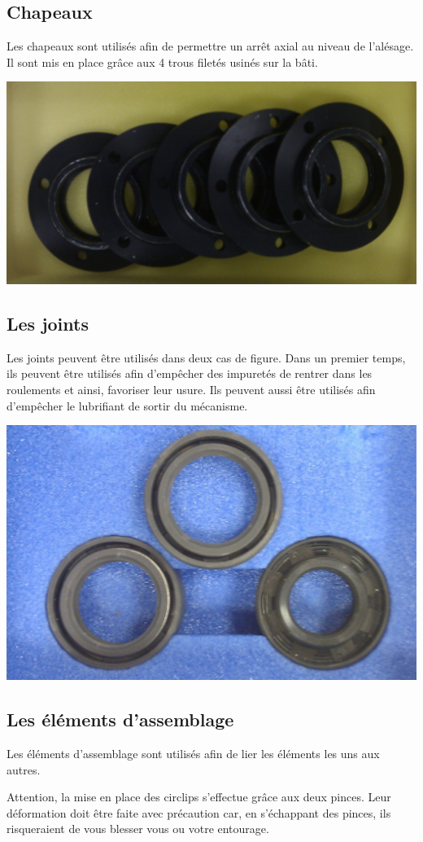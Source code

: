 \subsection{Chapeaux}

Les chapeaux sont utilisés afin de permettre un arrêt axial au niveau de l'alésage. Il sont mis en place grâce aux 4 trous filetés usinés sur la bâti.

\begin{center}
\includegraphics[width=0.5\linewidth]{img/Roulement6.jpg}
\end{center}

\newpage

\subsection{Les joints}

Les joints peuvent être utilisés dans deux cas de figure. Dans un premier temps, ils peuvent être utilisés afin d'empêcher des impuretés de rentrer dans les roulements et ainsi, favoriser leur usure. Ils peuvent aussi être utilisés afin d'empêcher le lubrifiant de sortir du mécanisme.

\begin{center}
\includegraphics[width=0.5\linewidth]{img/Roulement7.jpg}
\end{center}

\subsection{Les éléments d'assemblage}

Les éléments d'assemblage sont utilisés afin de lier les éléments les uns aux autres.

Attention, la mise en place des circlips s'effectue grâce aux deux pinces. Leur déformation doit être faite avec précaution car, en s'échappant des pinces, ils risqueraient de vous blesser vous ou votre entourage.

